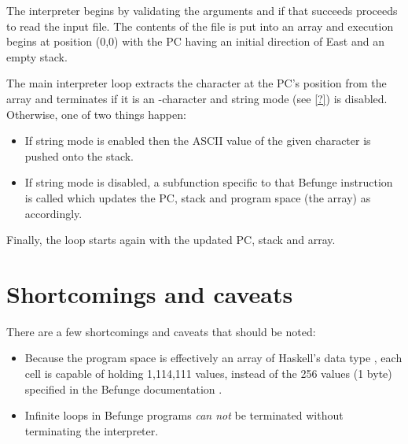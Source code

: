 \documentclass[12pt, a4paper]{article}
\begin{document}
The interpreter begins by validating the arguments and if that succeeds proceeds to read the input file. The contents of the file is put into an array and execution begins at position (0,0) with the PC having an initial direction of East and an empty stack.

The main interpreter loop extracts the character at the PC's position from the array and terminates if it is an -character and string mode (see \ref{?}) is disabled. Otherwise, one of two things happen:

\begin{itemize}
\item If string mode is enabled then the ASCII value of the given character is pushed onto the stack.

\item If string mode is disabled, a subfunction specific to that Befunge instruction is called which updates the PC, stack and program space (the array) as accordingly.
\end{itemize}

Finally, the loop starts again with the updated PC, stack and array.

\section{Shortcomings and caveats}

There are a few shortcomings and caveats that should be noted:

\begin{itemize}

\item Because the program space is effectively an array of Haskell's data type , each cell is capable of holding 1,114,111 values, instead of the 256 values (1 byte) specified in the Befunge documentation \cite{befunge93}.

\item Infinite loops in Befunge programs \emph{can not} be terminated without terminating the interpreter.

\end{itemize}

\vfill



\end{document}
